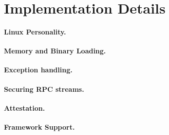 \section{Implementation Details}

\paragraph{Linux Personality.}

\paragraph{Memory and Binary Loading.}

\paragraph{Exception handling.}

\paragraph{Securing RPC streams.}

\paragraph{Attestation.}

\paragraph{Framework Support.}


